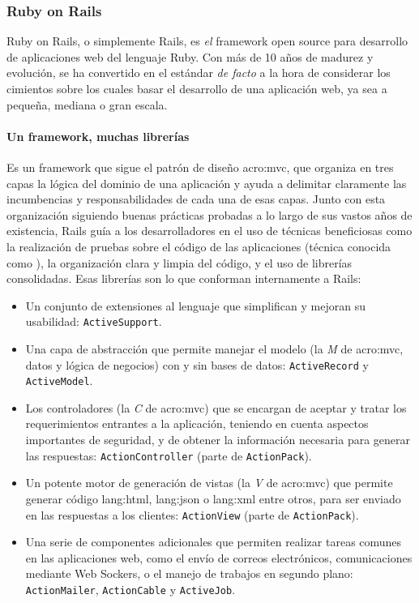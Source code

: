 \subsubsection{Ruby on Rails}
\label{soa:tecnologias:rails}

Ruby on Rails, o simplemente Rails, es \textit{el} framework open source para desarrollo de aplicaciones web del lenguaje Ruby. Con más de 10 años de madurez y evolución, se ha convertido en el estándar \textit{de facto} a la hora de considerar los cimientos sobre los cuales basar el desarrollo de una aplicación web, ya sea a pequeña, mediana o gran escala.

\paragraph{Un framework, muchas librerías}

Es un framework que sigue el patrón de diseño \gls{acro:mvc}, que organiza en tres capas la lógica del dominio de una aplicación y ayuda a delimitar claramente las incumbencias y responsabilidades de cada una de esas capas. Junto con esta organización siguiendo buenas prácticas probadas a lo largo de sus vastos años de existencia, Rails guía a los desarrolladores en el uso de técnicas beneficiosas como la realización de pruebas sobre el código de las aplicaciones (técnica conocida como ), la organización clara y limpia del código, y el uso de librerías consolidadas. Esas librerías son lo que conforman internamente a Rails:

\begin{itemize}
  \item Un conjunto de extensiones al lenguaje que simplifican y mejoran su usabilidad: \texttt{ActiveSupport}.
  \item Una capa de abstracción que permite manejar el modelo (la \textit{M} de \gls{acro:mvc}, datos y lógica de negocios) con y sin bases de datos: \texttt{ActiveRecord} y \texttt{ActiveModel}.
  \item Los controladores (la \textit{C} de \gls{acro:mvc}) que se encargan de aceptar y tratar los requerimientos entrantes a la aplicación, teniendo en cuenta aspectos importantes de seguridad, y de obtener la información necesaria para generar las respuestas: \texttt{ActionController} (parte de \texttt{ActionPack}).
  \item Un potente motor de generación de vistas (la \textit{V} de \gls{acro:mvc}) que permite generar código \gls{lang:html}, \gls{lang:json} o \gls{lang:xml} entre otros, para ser enviado en las respuestas a los clientes: \texttt{ActionView} (parte de \texttt{ActionPack}).
  \item Una serie de componentes adicionales que permiten realizar tareas comunes en las aplicaciones web, como el envío de correos electrónicos, comunicaciones mediante Web Sockers, o el manejo de trabajos en segundo plano: \texttt{ActionMailer}, \texttt{ActionCable} y \texttt{ActiveJob}.
\end{itemize}


